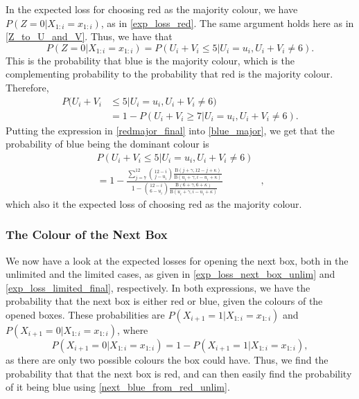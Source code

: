 In the expected loss for choosing red as the majority colour, we have $P(Z=0|X_{1:i}=x_{1:i})$, as in \eqref{exp_loss_red}. The same argument holds here as in \eqref{Z_to_U_and_V}. Thus, we have that
\begin{equation}
    P(Z=0|X_{1:i}=x_{1:i}) = P(U_i+V_i \leq 5 | U_i=u_i,U_i+V_i \neq 6).
\end{equation}
This is the probability that blue is the majority colour, which is the complementing probability to the probability that red is the majority colour. Therefore,
\begin{equation}
\label{blue_major}
    \begin{aligned}
        P(U_i+V_i& \leq 5 | U_i=u_i,U_i+V_i \neq 6) \\
        &= 1 - P(U_i+V_i \geq 7 | U_i=u_i,U_i+V_i \neq 6).
    \end{aligned}
\end{equation}
Putting the expression in \eqref{redmajor_final} into \eqref{blue_major}, we get that the probability of blue being the dominant colour is
\begin{equation}
\label{blue_major_final}
    \begin{aligned}
        P(U_i+V_i \leq 5 | U_i=u_i,U_i+V_i \neq 6) &\\[6pt]
        = 1 - \frac{\sum_{j=7}^{12} \binom{12-i}{j-u_i} \frac{\text{B}(j+\gamma,12-j+\kappa)}{\text{B}(u_i+\gamma,i-u_i+\kappa)}}{1-\binom{12-i}{6-u_i} \frac{\text{B}(6+\gamma,6+\kappa)}{\text{B}(u_i+\gamma,i-u_i+\kappa)}}&,
    \end{aligned}
\end{equation}
which also it the expected loss of choosing red as the majority colour. 

\subsubsection{The Colour of the Next Box}
We now have a look at the expected losses for opening the next box, both in the unlimited and the limited cases, as given in \eqref{exp_loss_next_box_unlim} and \eqref{exp_loss_limited_final}, respectively. In both expressions, we have the probability that the next box is either red or blue, given the colours of the opened boxes. 
These probabilities are $P(X_{i+1}=1|X_{1:i}=x_{1:i})$ and $P(X_{i+1}=0|X_{1:i}=x_{1:i})$, where 
\begin{equation}
\label{next_blue_from_red_unlim}
    P(X_{i+1}=0|X_{1:i}=x_{1:i}) = 1 - P(X_{i+1}=1|X_{1:i}=x_{1:i}),
\end{equation}
as there are only two possible colours the box could have. Thus, we find the probability that that the next box is red, and can then easily find the probability of it being blue using \eqref{next_blue_from_red_unlim}.

